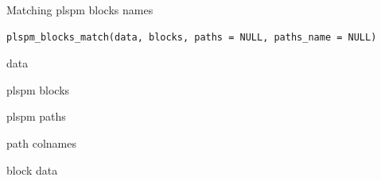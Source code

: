 \documentclass[a4paper]{book}
\begin{document}
%
\begin{Description}
Matching plspm blocks names
\end{Description}
%
\begin{Usage}
\begin{verbatim}
plspm_blocks_match(data, blocks, paths = NULL, paths_name = NULL)
\end{verbatim}
\end{Usage}
%
\begin{Arguments}
\begin{ldescription}
\item[\code{data}] data

\item[\code{blocks}] plspm blocks

\item[\code{paths}] plspm paths

\item[\code{paths\_name}] path colnames
\end{ldescription}
\end{Arguments}
%
\begin{Value}
block data
\end{Value}
%
\end{document}
